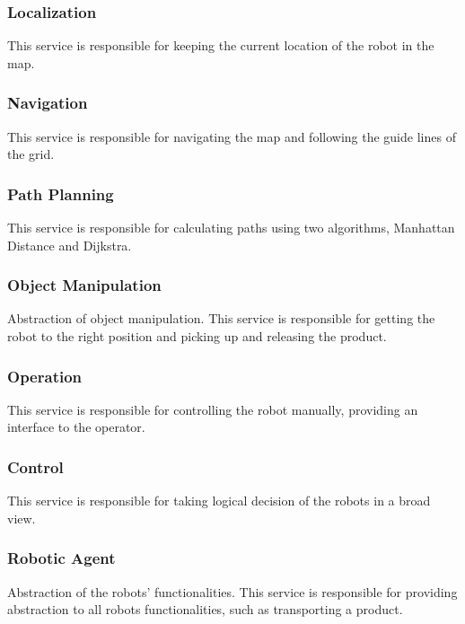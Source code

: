 \subsubsection*{Localization}
This service is responsible for keeping the current location of the robot in the map. 

\subsubsection*{Navigation}
This service is responsible for navigating the map and following the guide lines of the grid. 

\subsubsection*{Path Planning}
This service is responsible for calculating paths using two algorithms, Manhattan Distance and Dijkstra. 

\subsubsection*{Object Manipulation}
Abstraction of object manipulation. This service is responsible for getting the robot to the right position and picking up and releasing the product.


\subsubsection*{Operation}
This service is responsible for controlling the robot manually, providing an interface to the operator.

\subsubsection*{Control}
This service is responsible for taking logical decision of the robots in a broad view.

\subsubsection*{Robotic Agent}
Abstraction of the robots' functionalities. This service is responsible for providing abstraction to all robots functionalities, such as transporting a product.%

